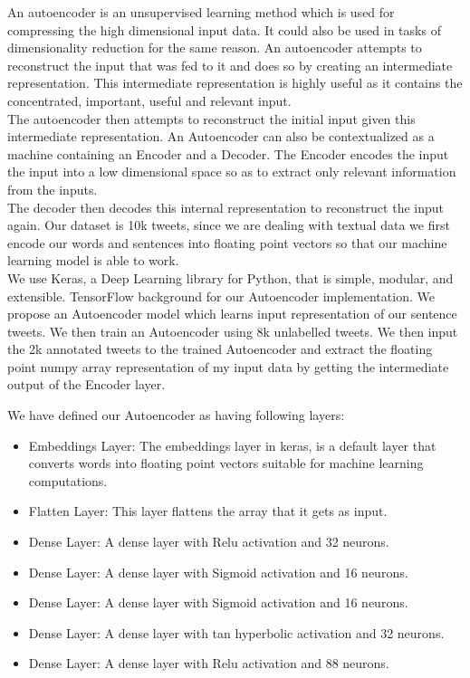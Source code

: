 \documentclass[a4paper,11pt]{article}
\begin{document}
An autoencoder is an unsupervised learning method which is used for compressing the high dimensional input data. It could also be used in tasks of dimensionality reduction for the same reason.
An autoencoder attempts to reconstruct the input that was fed to it and does so by creating an intermediate representation. This intermediate representation is highly useful as it contains the concentrated, important, useful and relevant input.
\medskip\\
The autoencoder then attempts to reconstruct the initial input given this intermediate representation. An Autoencoder can also be contextualized as a machine containing an Encoder and a Decoder. The Encoder encodes the input the input into a low dimensional space so as to extract only relevant information from the inputs.
\medskip\\
The decoder then decodes this internal representation to reconstruct the input again.
Our dataset is 10k tweets, since we are dealing with textual data we first encode our words and sentences into floating point vectors so that our machine learning model is able to work.
\medskip\\
We use Keras, a Deep Learning library for Python, that is simple, modular, and extensible. TensorFlow background for our Autoencoder implementation. We propose an Autoencoder model which learns input representation of our sentence tweets. We then train an Autoencoder using 8k unlabelled tweets. We then input the 2k annotated tweets to the trained Autoencoder and extract the floating point numpy array representation of my input data by getting the intermediate output of the Encoder layer.


We have defined our Autoencoder as having following layers:
\begin{itemize}
    \item Embeddings Layer: The embeddings layer in keras, is a default layer that converts words into floating point vectors suitable for machine learning computations.
    \item Flatten Layer: This layer flattens the array that it gets as input.
    \item Dense Layer: A dense layer with Relu activation and 32 neurons.
    \item Dense Layer: A dense layer with Sigmoid activation and 16 neurons.
    \item Dense Layer: A dense layer with Sigmoid activation and 16 neurons.
    \item Dense Layer: A dense layer with tan hyperbolic activation and 32 neurons.
    \item Dense Layer: A dense layer with Relu activation and 88 neurons.
\end{itemize}
\end{document}
